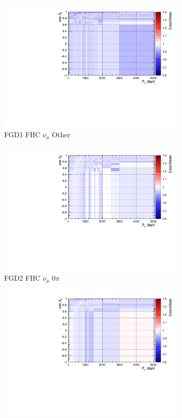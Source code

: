 \begin{figure}
\begin{subfigure}{.32\textwidth}
\end{subfigure}
\begin{subfigure}{.32\textwidth}
  \centering
  \includegraphics[width=0.85\linewidth]{figs/priorpred_FGD1_numuCC_other.pdf}
  \caption{FGD1 FHC $\nu_{\mu}$ Other}
  \label{fig:priorpred_FGD1_numuCC_other}
\end{subfigure}
\centering
\begin{subfigure}{.32\textwidth}
  \centering
  \includegraphics[width=0.85\linewidth]{figs/priorpred_FGD2_numuCC_0pi.pdf}
  \caption{FGD2 FHC $\nu_{\mu}$ 0$\pi$}
  \label{fig:priorpred_FGD2_numuCC_0pi}
\end{subfigure}
\begin{subfigure}{.32\textwidth}
  \centering
  \includegraphics[width=0.85\linewidth]{figs/priorpred_FGD2_numuCC_1pi.pdf}

\end{subfigure}
\end{figure}
